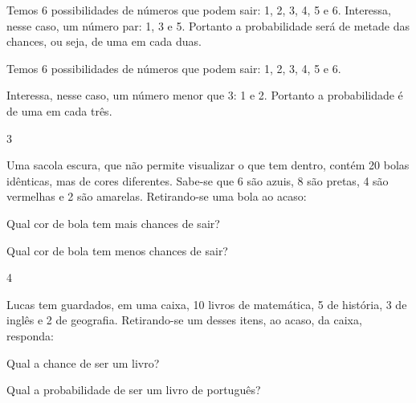 \begin{escolha}
{\begin{escolha}
\begin{escolha}

\item
  Temos 6 possibilidades de números que podem sair: 1, 2, 3, 4, 5 e 6.
  Interessa, nesse caso, um número par: 1, 3 e 5. Portanto a probabilidade será de metade das chances, ou seja, de uma em cada duas.
\end{escolha}



\begin{escolha}

\item
  Temos 6 possibilidades de números que podem sair: 1, 2, 3, 4, 5 e 6.
\end{escolha}

Interessa, nesse caso, um número menor que 3: 1 e 2. Portanto a probabilidade é de uma em cada três.


\num{3}

Uma sacola escura, que não permite visualizar o que tem dentro, contém
20 bolas idênticas, mas de cores diferentes. Sabe-se que 6 são azuis, 8
são pretas, 4 são vermelhas e 2 são amarelas. Retirando-se uma bola ao
acaso:

\begin{escolha}

\item
Qual cor de bola tem mais chances de sair?

\item
 Qual cor de bola tem menos chances de sair?
\end{escolha}


\num{4}

Lucas tem guardados, em uma caixa, 10 livros de matemática, 5 de história, 3 de inglês e
2 de geografia. Retirando-se um desses itens, ao acaso, da caixa,
responda:

\begin{escolha}

\item
 Qual a chance de ser um livro?

\item
  Qual a probabilidade de ser um livro de português?


\end{escolha}
\end{escolha}}
\end{escolha}
